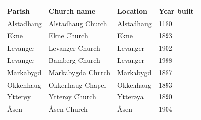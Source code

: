 \documentclass{article}
\begin{document}
\begin{tabular}{llll}
\toprule
Parish & Church name & Location & Year built \\
\midrule
Alstadhaug & Alstadhaug Church & Alstadhaug & 1180 \\
Ekne & Ekne Church & Ekne & 1893 \\
Levanger & Levanger Church & Levanger & 1902 \\
Levanger & Bamberg Church & Levanger & 1998 \\
Markabygd & Markabygda Church & Markabygd & 1887 \\
Okkenhaug & Okkenhaug Chapel & Okkenhaug & 1893 \\
Ytterøy & Ytterøy Church & Ytterøya & 1890 \\
Åsen & Åsen Church & Åsen & 1904 \\
\bottomrule
\end{tabular}
\end{document}
